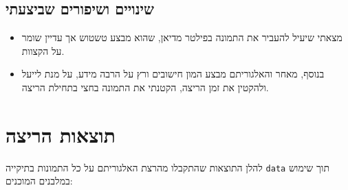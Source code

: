 \documentclass[a4paper,12pt]{article}
\begin{document}
\subsection*{שינויים ושיפורים שביצעתי}

\begin{itemize}
    \item מצאתי שיעיל להעביר את התמונה בפילטר מדיאן, שהוא מבצע טשטוש אך עדיין שומר על הקצוות.
    \item בנוסף, מאחר והאלגוריתם מבצע המון חישובים ורץ על הרבה מידע, על מנת לייעל ולהקטין את זמן הריצה, הקטנתי את התמונה בחצי בתחילת הריצה.
\end{itemize}

\section*{תוצאות הריצה}

להלן התוצאות שהתקבלו מהרצת האלגוריתם על כל התמונות בתיקייה \texttt{data} תוך שימוש במלבנים המוכנים:
\end{document}
